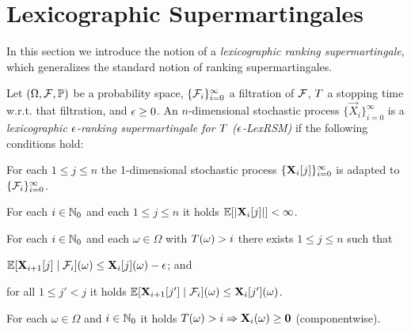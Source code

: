 \section{Lexicographic Supermartingales}
\label{sec:lexicographic}

In this section we introduce the notion of a \emph{lexicographic ranking 
supermartingale}, which generalizes the standard notion of ranking 
supermartingales.

\begin{definition}
Let $(\Omega,\mathcal{F},\mathbb{P})$ be a probability space, 
$\{\mathcal{F}_i\}_{i=0}^{\infty}$ a filtration of $\mathcal{F}$, $T$ a stopping 
time w.r.t. that filtration, and 
$\epsilon\geq 0$. 
An $n$-dimensional stochastic process $\{\vec{X}_{i}\}_{i=0}^{\infty}$ is a 
\emph{lexicographic $\epsilon$-ranking supermartingale for $T$ 
($\epsilon$-LexRSM)} if the 
following 
conditions hold:
\begin{compactenum}
\item For each $1\leq j \leq n$ the 1-dimensional stochastic process 
$\{\mathbf{X}_{i}[j]\}_{i=0}^{\infty}$ is adapted to 
$\{\mathcal{F}_i\}_{i=0}^{\infty}$.
\item For each $i\in \mathbb{N}_0$ and each $1\leq j \leq n$ it holds 
$\mathbb{E}[|\mathbf{X}_{i}[j]|]<\infty$.
\item For each $i\in \mathbb{N}_0$ and each $\omega\in \Omega$ with 
$T(\omega)>i$ there exists $1\leq j 
\leq n$ such that
\begin{compactitem}
	\item $\mathbb{E}[\mathbf{X}_{i+1}[j]\mid 
	\mathcal{F}_i](\omega)\leq\mathbf{X}_{i}[j](\omega) - 
	\epsilon$; and
	\item for all $1 \leq j' < j$ it holds $\mathbb{E}[\mathbf{X}_{i+1}[j']\mid 
	\mathcal{F}_i](\omega)\leq\mathbf{X}_{i}[j'](\omega)$.
\end{compactitem}
\item For each $\omega \in \Omega$ and $i\in \mathbb{N}_0$ it holds 
$T(\omega)>i 
\Rightarrow \mathbf{X}_i (\omega)\geq \mathbf{0}$ (componentwise).
\end{compactenum}
\end{definition}

